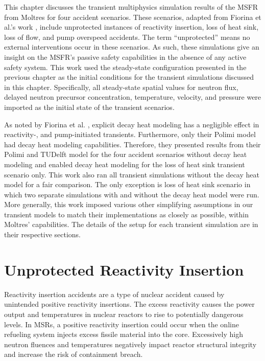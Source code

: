 This chapter discusses the transient multiphysics simulation results of the
\gls{MSFR} from Moltres for four accident scenarios. These scenarios, adapted
from Fiorina et al.'s work \cite{fiorina_modelling_2014}, include unprotected
instances of reactivity insertion, loss of heat sink, loss of flow, and pump
overspeed accidents. The term ``unprotected'' means no external interventions
occur in these scenarios. As such, these simulations
give an insight on the \gls{MSFR}'s passive safety capabilities in the absence
of any active safety system. This work used the steady-state configuration
presented in the previous chapter as the initial conditions for the transient
simulations discussed in this chapter. Specifically, all steady-state spatial
values for neutron flux, delayed neutron precursor concentration, temperature,
velocity, and pressure were imported as the initial state of the transient
scenarios.

As noted by Fiorina et al. \cite{fiorina_modelling_2014}, explicit decay heat
modeling has a negligible effect in reactivity-, and pump-initiated
transients. Furthermore, only their Polimi model had decay
heat modeling capabilities. Therefore, they presented results from their
Polimi and TUDelft model for the four accident scenarios without decay heat
modeling and enabled decay heat modeling for the loss of heat sink transient
scenario only. This work also ran all transient simulations without the decay
heat model for a fair comparison. The only exception is loss of heat sink
scenario in which two separate simulations with and without the decay heat
model were run. More generally, this work imposed various other simplifying
assumptions in our transient models to match their implementations as closely
as possible, within Moltres' capabilities. The details of the setup for each
transient simulation are in their respective sections.

\section{Unprotected Reactivity Insertion}

Reactivity insertion accidents are a type of nuclear accident caused by
unintended positive
reactivity insertions. The excess reactivity causes the power output and
temperatures in nuclear reactors to rise to potentially dangerous levels. In
\glspl{MSR}, a positive reactivity insertion could occur when the online
refueling system injects excess fissile material into the core. Excessively
high neutron fluences and temperatures negatively impact reactor structural
integrity and increase the risk of containment breach.

